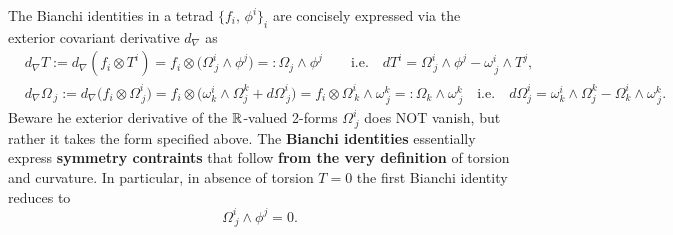 \documentclass[../geometry_main.tex]{subfiles}
\begin{document}
\begin{mytheorem}
%
The Bianchi identities in a tetrad $\{f_i,\,\phi^i\}_i$ are concisely expressed via the exterior covariant derivative $d_\nabla$ as
{\small\begin{align}
    &d_\nabla T:=d_\nabla(f_i\otimes T^i) = f_i\otimes\big( \Omega^i_{\, j} \wedge \phi^j\big)=:\Omega_j\wedge \phi^j\qquad \text{i.e.}\quad dT^i= \Omega^i_{\, j} \wedge \phi^j - \omega^i_{\, j} \wedge T^j,
    \\
    &d_\nabla\Omega_{\, j}:=d_\nabla\Big(f_i \otimes \Omega^i_{\, j}\Big) = f_i \otimes \Big(\omega_k^i\wedge \Omega^k_j + d \Omega_{\, j}^i\Big) = f_i \otimes \Omega^i_{\, k} \wedge \omega^k_{\, j}=:\Omega_k \wedge \omega^k_{\, j} \quad \text{i.e.}\quad d\Omega^i_j = \omega^i_k\wedge \Omega^k_j - \Omega^i_k \wedge \omega^k_{\, j}.
\end{align}}
Beware he exterior derivative of the $\mathbb{R}$-valued 2-forms $\Omega^i_{\, j}$ does NOT vanish, but rather it takes the form specified above.
The \textbf{Bianchi identities} essentially express \textbf{symmetry contraints} that follow \textbf{from the very definition} of torsion and curvature.
In particular, in absence of torsion $T=0$ the first Bianchi identity reduces to
\begin{equation}
    \Omega^i_{\, j} \wedge \phi^j = 0.
\end{equation}
\end{mytheorem}
\vspace{-3mm}
\end{document}
